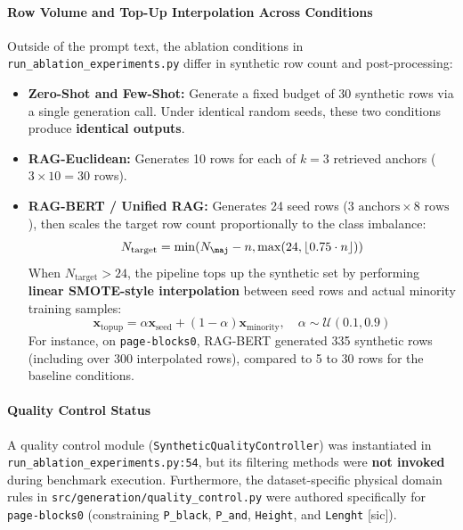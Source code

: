 \documentclass[sn-basic]{sn-jnl}
\begin{document}
\paragraph{Row Volume and Top-Up Interpolation Across Conditions}
Outside of the prompt text, the ablation conditions in \texttt{run\_ablation\_experiments.py} differ in synthetic row count and post-processing:
\begin{itemize}
    \item \textbf{Zero-Shot and Few-Shot:} Generate a fixed budget of 30 synthetic rows via a single generation call. Under identical random seeds, these two conditions produce \textbf{identical outputs}.
    \item \textbf{RAG-Euclidean:} Generates 10 rows for each of $k=3$ retrieved anchors ($3 \times 10 = 30$ rows).
    \item \textbf{RAG-BERT / Unified RAG:} Generates 24 seed rows ($3 \text{ anchors} \times 8 \text{ rows}$), then scales the target row count proportionally to the class imbalance:
    \begin{equation}
    \label{eq:target_synthetic}
    N_{\text{target}} = \min(N_{\maj} - n, \max(24, \lfloor 0.75 \cdot n \rfloor))
    \end{equation}
    When $N_{\text{target}} > 24$, the pipeline tops up the synthetic set by performing \textbf{linear SMOTE-style interpolation} between seed rows and actual minority training samples:
    \begin{equation}
    \label{eq:topup_smote}
    \mathbf{x}_{\text{topup}} = \alpha \mathbf{x}_{\text{seed}} + (1 - \alpha) \mathbf{x}_{\text{minority}}, \quad \alpha \sim \mathcal{U}(0.1, 0.9)
    \end{equation}
    For instance, on \texttt{page-blocks0}, RAG-BERT generated 335 synthetic rows (including over 300 interpolated rows), compared to 5 to 30 rows for the baseline conditions.
\end{itemize}

\paragraph{Quality Control Status}
A quality control module (\texttt{SyntheticQualityController}) was instantiated in \texttt{run\_ablation\_experiments.py:54}, but its filtering methods were \textbf{not invoked} during benchmark execution. Furthermore, the dataset-specific physical domain rules in \texttt{src/generation/quality\_control.py} were authored specifically for \texttt{page-blocks0} (constraining \texttt{P\_black}, \texttt{P\_and}, \texttt{Height}, and \texttt{Lenght} [sic]).
\end{document}
